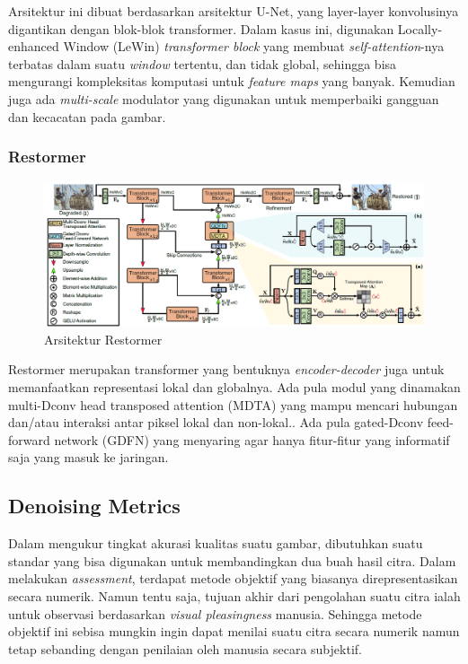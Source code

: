 \documentclass[11pt, a4paper, final]{report}
\begin{document}
Arsitektur ini dibuat berdasarkan arsitektur U-Net, yang layer-layer konvolusinya digantikan dengan blok-blok transformer. Dalam kasus ini, digunakan Locally-enhanced Window (LeWin) \textit{transformer block} yang membuat \textit{self-attention}-nya terbatas dalam suatu \textit{window} tertentu, dan tidak global, sehingga bisa mengurangi kompleksitas komputasi untuk \textit{feature maps} yang banyak. Kemudian juga ada \textit{multi-scale} modulator yang digunakan untuk memperbaiki gangguan dan kecacatan pada gambar.

\subsubsection{Restormer}

\begin{figure}[H]
\centering
\includegraphics[scale=0.5]{assets/Restormer.png}
\caption{Arsitektur Restormer \cite{dosovitskiy2021image}}
\end{figure}

Restormer merupakan transformer yang bentuknya \textit{encoder-decoder} juga untuk memanfaatkan representasi lokal dan globalnya. Ada pula modul yang dinamakan multi-Dconv head transposed attention (MDTA) yang mampu mencari hubungan dan/atau interaksi antar piksel lokal dan non-lokal.. Ada pula gated-Dconv feed-forward network (GDFN) yang menyaring agar hanya fitur-fitur yang informatif saja yang masuk ke jaringan.

\subsection{Denoising Metrics}

Dalam mengukur tingkat akurasi kualitas suatu gambar, dibutuhkan suatu standar yang bisa digunakan untuk membandingkan dua buah hasil citra. Dalam melakukan \textit{assessment}, terdapat metode objektif yang biasanya direpresentasikan secara numerik. Namun tentu saja, tujuan akhir dari pengolahan suatu citra ialah untuk observasi berdasarkan \textit{visual pleasingness} manusia. Sehingga metode objektif ini sebisa mungkin ingin dapat menilai suatu citra secara numerik namun tetap sebanding dengan penilaian oleh manusia secara subjektif.
\end{document}
